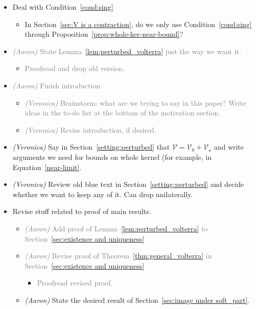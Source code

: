 \documentclass{article}
\theoremstyle{plain}
\newcommand{\volterra}{\mathcal{V}}
\newcommand{\hardpart}{\mathcal{V}_0}
\newcommand{\softpart}{\mathcal{V}_\star}
\newenvironment{brainstorm}{\color{violet}\begin{itemize}}{\end{itemize}\color{black}}
\begin{document}
\begin{brainstorm}
\item Deal with Condition~\eqref{cond:sing}
\begin{itemize}
\item In Section~\ref{sec:V is a contraction}, do we only use Condition~\eqref{cond:sing} through Proposition~\ref{prop:whole-ker-near-bound}?
\end{itemize}
\item \textcolor{gray}{\textit{(Aaron)} State Lemma~\ref{lem:perturbed_volterra} just the way we want it.}
\begin{itemize}
    \item \textcolor{gray}{Proofread and drop old version.}
\end{itemize}
\item \textcolor{gray}{\textit{(Aaron)} Finish introduction}
\begin{itemize}
\item \textcolor{gray}{\textit{(Veronica)} Brainstorm: what are we trying to say in this paper? Write ideas in the to-do list at the bottom of the motivation section.}
\item \textcolor{gray}{\textit{(Veronica)} Revise introduction, if desired.}
\end{itemize}
\color{gray}
\item \textit{(Veronica)} Say in Section~\ref{setting:perturbed} that $\volterra = \hardpart + \softpart$ and write arguments we need for bounds on whole kernel (for example, in Equation~\ref{near-limit}.
\color{gray}
\item \textit{(Veronica)} Review old blue text in Section~\ref{setting:perturbed} and decide whether we want to keep any of it. Can drop unilaterally. 
\color{violet}
\item Revise stuff related to proof of main results.
\begin{itemize}
        \item \textcolor{gray}{\textit{(Aaron)} Add proof of Lemma~\ref{lem:perturbed_volterra} to Section~\ref{sec:existence and uniqueness}}
        \item \textcolor{gray}{\textit{(Aaron)} Revise proof of Theorem~\ref{thm:general_volterra} in Section~\ref{sec:existence and uniqueness}}
        \begin{itemize}
            \item \textcolor{gray}{Proofread revised proof.}
        \end{itemize}
        \item \textit{(Aaron)} State the desired result of Section~\ref{sec:image under soft_part}.

\end{itemize}
\end{brainstorm}
\end{document}
